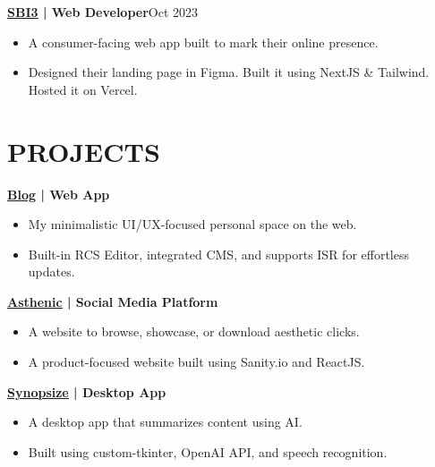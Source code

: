 \documentclass[a4paper,11pt]{article}
\newcommand{\entry}[2]{
  \noindent\textbf{#1}\hfill{#2}\\[-1em]
}
\newcommand{\contactlink}[2]{
    \href{#1}{\color{cyan}\underline{#2}}
}
\newenvironment{itemizeWithPadding}{
  \begin{itemize}
}{
  \end{itemize}
  \vspace{0.5em} %
}
\begin{document}
\entry{\contactlink{https://sbi3.vercel.app/}{SBI3} | Web Developer}{Oct 2023}
\begin{itemizeWithPadding}
  \item A consumer-facing web app built to mark their online presence.
  \item Designed their landing page in Figma. Built it using NextJS \& Tailwind. Hosted it on Vercel.
\end{itemizeWithPadding}

\section*{PROJECTS}

\entry{\contactlink{https://abhigyan.tech/blog}{Blog} | Web App}{}
\begin{itemizeWithPadding}
  \item My minimalistic UI/UX-focused personal space on the web.
  \item Built-in RCS Editor, integrated CMS, and supports ISR for effortless updates.
\end{itemizeWithPadding}

\entry{\contactlink{https://asthenic.vercel.app/}{Asthenic} | Social Media Platform}{}
\begin{itemizeWithPadding}
  \item A website to browse, showcase, or download aesthetic clicks.
  \item A product-focused website built using Sanity.io and ReactJS.
\end{itemizeWithPadding}

\entry{\contactlink{https://github.com/AbhigyanBafna/Synopsize}{Synopsize} | Desktop App}{}
\begin{itemizeWithPadding}
  \item A desktop app that summarizes content using AI.
  \item Built using custom-tkinter, OpenAI API, and speech recognition.
\end{itemizeWithPadding}

\end{document}
